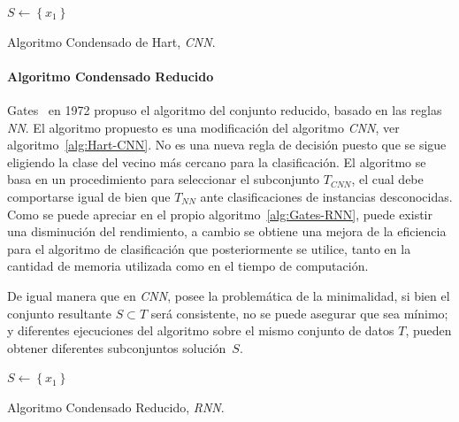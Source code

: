 \begin{algorithm}[H]
  	\BlankLine
  $S \leftarrow \left\lbrace x_1 \right\rbrace$\\
	\caption{Algoritmo Condensado de Hart, \textit{CNN}.}\label{alg:Hart-CNN}
\end{algorithm}

\paragraph{Algoritmo Condensado Reducido}\label{paragraph:RNN}
\hfill \break
Gates~\cite{gates1972reduced} en 1972 propuso el algoritmo del conjunto reducido, basado en las reglas \textit{NN}. El algoritmo propuesto es una modificación del algoritmo \textit{CNN}, ver algoritmo~\ref{alg:Hart-CNN}. No es una nueva regla de decisión puesto que se sigue eligiendo la clase del vecino más cercano para la clasificación. 
El algoritmo se basa en un procedimiento para seleccionar el subconjunto $T_{CNN}$, el cual debe comportarse igual de bien que $T_{NN}$ ante clasificaciones de instancias desconocidas. Como se puede apreciar en el propio algoritmo~\ref{alg:Gates-RNN}, puede existir una disminución del rendimiento, a cambio se obtiene una mejora de la eficiencia para el algoritmo de clasificación que posteriormente se utilice, tanto en la cantidad de memoria utilizada como en el tiempo de computación.

De igual manera que en \textit{CNN}, posee la problemática de la minimalidad, si bien el conjunto resultante $S \subset T$ será consistente, no se puede asegurar que sea mínimo; y diferentes ejecuciones del algoritmo sobre el mismo conjunto de datos $T$, pueden obtener diferentes subconjuntos solución~$S$.

\begin{algorithm}[H]
  	\BlankLine
  $S \leftarrow \left\lbrace x_1 \right\rbrace$\\
	\caption{Algoritmo Condensado Reducido, \textit{RNN}.}\label{alg:Gates-RNN}
\end{algorithm}

